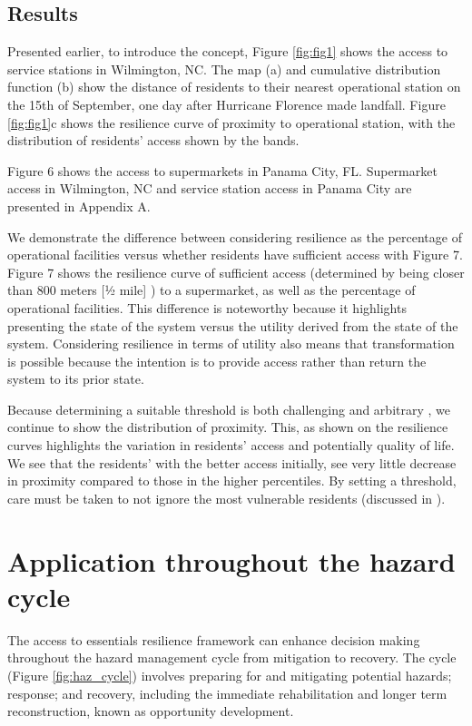 \documentclass[9pt,twocolumn,twoside,lineno]{pnas-new}
\begin{document}
\subsection*{Results}
Presented earlier, to introduce the concept, Figure \ref{fig:fig1} shows the access to service stations in Wilmington, NC. The map (a) and cumulative distribution function (b) show the distance of residents to their nearest operational station on the 15th of September, one day after Hurricane Florence made landfall. Figure \ref{fig:fig1}c  shows the resilience curve of proximity to operational station, with the distribution of residents’ access shown by the bands.

Figure 6 shows the access to supermarkets in Panama City, FL. Supermarket access in Wilmington, NC and service station access in Panama City are presented in Appendix A. 

We demonstrate the difference between considering resilience as the percentage of operational facilities versus whether residents have sufficient access with Figure 7. Figure 7 shows the resilience curve of sufficient access (determined by being closer than 800 meters [½ mile] \cite{Talen2003-dc}) to a supermarket, as well as the percentage of operational facilities. This difference is noteworthy because it highlights presenting the state of the system versus the utility derived from the state of the system. Considering resilience in terms of utility also means that transformation is possible because the intention is to provide access rather than return the system to its prior state.

Because determining a suitable threshold is both challenging and arbitrary \cite{Dempsey2008-hr}, we continue to show the distribution of proximity. This, as shown on the resilience curves highlights the variation in residents’ access and potentially quality of life. We see that the residents’ with the better access initially, see very little decrease in proximity compared to those in the higher percentiles. By setting a threshold, care must be taken to not ignore the most vulnerable residents (discussed in \cite{Logan2017-fr}).

\section*{Application throughout the hazard cycle}
The access to essentials resilience framework can enhance decision making throughout the hazard management cycle from mitigation to recovery. The cycle (Figure \ref{fig:haz_cycle}) involves preparing for and mitigating potential hazards; response; and recovery, including the immediate rehabilitation and longer term reconstruction, known as opportunity development.
\end{document}
